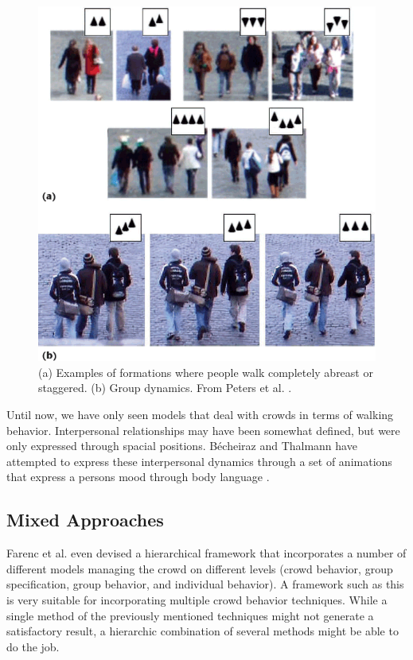 \documentclass[11pt, a4paper]{book}
\begin{document}
\begin{figure}[h!]
\centering
\includegraphics[width=.6\textwidth]{./formations.png}
\caption{(a) Examples of formations where people walk completely abreast or staggered. (b) Group dynamics. From Peters et al. \cite{10.1109MCG.2009.69}.}
\label{fig:formations}
\end{figure}

Until now, we have only seen models that deal with crowds in terms of walking behavior. Interpersonal relationships may have been somewhat defined, but were only expressed through spacial positions. Bécheiraz and Thalmann have attempted to express these interpersonal dynamics through a set of animations that express a persons mood through body language \cite{Becheiraz:1996:MNC:791215.791499}.

\subsection{Mixed Approaches}
Farenc et al. even devised a hierarchical framework that incorporates a number of different models managing the crowd on different levels (crowd behavior, group specification, group behavior, and individual behavior). A framework such as this is very suitable for incorporating multiple crowd behavior techniques. While a single method of the previously mentioned techniques might not generate a satisfactory result, a hierarchic combination of several methods might be able to do the job.\\

\end{document}
